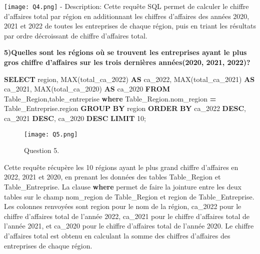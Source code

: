 \documentclass[mstat,12pt]{unswthesis}
\newenvironment{Shaded}{\begin{snugshade}}{\end{snugshade}}
\newcommand{\DecValTok}[1]{\textcolor[rgb]{0.00,0.00,0.81}{#1}}
\newcommand{\FunctionTok}[1]{\textcolor[rgb]{0.00,0.00,0.00}{#1}}
\newcommand{\KeywordTok}[1]{\textcolor[rgb]{0.13,0.29,0.53}{\textbf{#1}}}
\newcommand{\NormalTok}[1]{#1}
\newcommand{\OperatorTok}[1]{\textcolor[rgb]{0.81,0.36,0.00}{\textbf{#1}}}
\begin{document}
\texttt{[image: Q4.png]} - Description: Cette
requête SQL permet de calculer le chiffre d'affaires total par région en
additionnant les chiffres d'affaires des années 2020, 2021 et 2022 de
toutes les entreprises de chaque région, puis en triant les résultats
par ordre décroissant de chiffre d'affaires total.

\large
\enspace

\textbf{5)Quelles sont les régions où se trouvent les entreprises ayant
le plus gros chiffre d'affaires sur les trois dernières années(2020,
2021, 2022)? }

\begin{Shaded}
\begin{Highlighting}[]
\KeywordTok{SELECT}\NormalTok{ region, }
       \FunctionTok{MAX}\NormalTok{(total\_ca\_2022) }\KeywordTok{AS}\NormalTok{ ca\_2022, }
       \FunctionTok{MAX}\NormalTok{(total\_ca\_2021) }\KeywordTok{AS}\NormalTok{ ca\_2021, }
       \FunctionTok{MAX}\NormalTok{(total\_ca\_2020) }\KeywordTok{AS}\NormalTok{ ca\_2020 }
\KeywordTok{FROM}\NormalTok{ Table\_Region,table\_entreprise }
\KeywordTok{where}\NormalTok{ Table\_Region.nom\_region }\OperatorTok{=}\NormalTok{ Table\_Entreprise.region }
\KeywordTok{GROUP} \KeywordTok{BY}\NormalTok{ region }
\KeywordTok{ORDER} \KeywordTok{BY}\NormalTok{ ca\_2022 }\KeywordTok{DESC}\NormalTok{, ca\_2021 }\KeywordTok{DESC}\NormalTok{, ca\_2020 }\KeywordTok{DESC} 
\KeywordTok{LIMIT} \DecValTok{10}\NormalTok{;}
\end{Highlighting}
\end{Shaded}

\begin{figure}
\centering
\texttt{[image: Q5.png]}
\caption{Question 5.}
\end{figure}

\medskip

Cette requête récupère les 10 régions ayant le plus grand chiffre
d'affaires en 2022, 2021 et 2020, en prenant les données des tables
Table\_Region et Table\_Entreprise. La clause \textbf{where} permet de
faire la jointure entre les deux tables sur le champ nom\_region de
Table\_Region et region de Table\_Entreprise. Les colonnes renvoyées
sont region pour le nom de la région, ca\_2022 pour le chiffre
d'affaires total de l'année 2022, ca\_2021 pour le chiffre d'affaires
total de l'année 2021, et ca\_2020 pour le chiffre d'affaires total de
l'année 2020. Le chiffre d'affaires total est obtenu en calculant la
somme des chiffres d'affaires des entreprises de chaque région.
\end{document}
